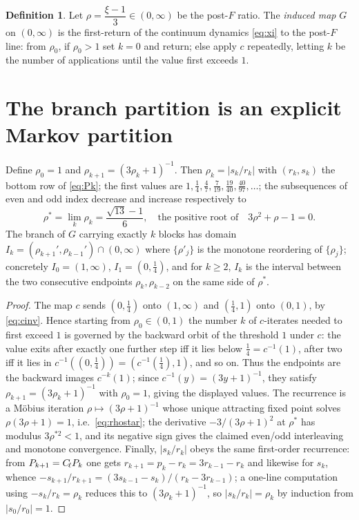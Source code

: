\documentclass[11pt]{article}
\theoremstyle{definition}\newtheorem{definition}{Definition}
\theoremstyle{remark}\newtheorem{remark}{Remark}
\begin{document}
\begin{definition}\label{def:G}
Let $\rho=\dfrac{\xi-1}{3}\in(0,\infty)$ be the post-$F$ ratio. The
\emph{induced map} $G$ on $(0,\infty)$ is the first-return of the continuum
dynamics \eqref{eq:xi} to the post-$F$ line: from $\rho_0$, if $\rho_0>1$
set $k=0$ and return; else apply $c$ repeatedly, letting $k$ be the number
of applications until the value first exceeds $1$.
\end{definition}

\section{The branch partition is an explicit Markov partition}
\begin{lemma}\label{lem:endpoints}
Define $\rho_0=1$ and $\rho_{k+1}=(3\rho_k+1)^{-1}$. Then $\rho_k=|s_k/r_k|$
with $(r_k,s_k)$ the bottom row of \eqref{eq:Pk}; the first values are
$1,\tfrac14,\tfrac47,\tfrac7{19},\tfrac{19}{40},\tfrac{40}{97},\dots$; the
subsequences of even and odd index decrease and increase respectively to
\begin{equation}\label{eq:rhostar}
\rho^\ast=\lim_k\rho_k=\frac{\sqrt{13}-1}{6},\quad\text{the positive root of}\quad 3\rho^2+\rho-1=0.
\end{equation}
The branch of $G$ carrying exactly $k$ blocks has domain
$I_k=(\rho_{k+1}',\rho_{k-1}')\cap(0,\infty)$ where $\{\rho'_j\}$ is the
monotone reordering of $\{\rho_j\}$; concretely $I_0=(1,\infty)$,
$I_1=(0,\tfrac14)$, and for $k\ge2$, $I_k$ is the interval between the two
consecutive endpoints $\rho_k,\rho_{k-2}$ on the same side of $\rho^\ast$.
\end{lemma}
\begin{proof}
The map $c$ sends $(0,\tfrac14)$ onto $(1,\infty)$ and $(\tfrac14,1)$ onto
$(0,1)$, by \eqref{eq:cinv}. Hence starting from $\rho_0\in(0,1)$ the
number $k$ of $c$-iterates needed to first exceed $1$ is governed by the
backward orbit of the threshold $1$ under $c$: the value exits after
exactly one further step iff it lies below $\tfrac14=c^{-1}(1)$, after two
iff it lies in $c^{-1}((0,\tfrac14))=(c^{-1}(\tfrac14),1)$, and so on.
Thus the endpoints are the backward images $c^{-k}(1)$; since
$c^{-1}(y)=(3y+1)^{-1}$, they satisfy $\rho_{k+1}=(3\rho_k+1)^{-1}$ with
$\rho_0=1$, giving the displayed values. The recurrence is a M\"obius
iteration $\rho\mapsto(3\rho+1)^{-1}$ whose unique attracting fixed point
solves $\rho(3\rho+1)=1$, i.e.\ \eqref{eq:rhostar}; the derivative
$-3/(3\rho+1)^2$ at $\rho^\ast$ has modulus $3\rho^{\ast2}<1$, and its
negative sign gives the claimed even/odd interleaving and monotone
convergence. Finally, $|s_k/r_k|$ obeys the same first-order recurrence:
from $P_{k+1}=C_{\!\ell}P_k$ one gets $r_{k+1}=p_k-r_k=3r_{k-1}-r_k$ and
likewise for $s_k$, whence $-s_{k+1}/r_{k+1}=(3s_{k-1}-s_k)/(r_k-3r_{k-1})$;
a one-line computation using $-s_k/r_k=\rho_k$ reduces this to
$(3\rho_k+1)^{-1}$, so $|s_k/r_k|=\rho_k$ by induction from
$|s_0/r_0|=1$.
\end{proof}
\end{document}
